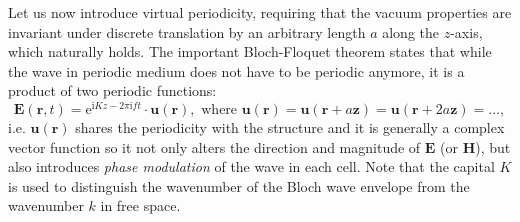 \documentclass[letterpaper,12pt]{report}
\begin{document}
Let us now introduce virtual periodicity, requiring that the vacuum properties are invariant under discrete translation by an arbitrary length $a$ along the $z$-axis, which naturally holds. The important Bloch-Floquet theorem states that while the wave in periodic medium does not have to be periodic anymore, it is a product of two periodic functions:
\begin{equation} \mathbf{E}(\mathbf{r}, t) = \mathrm{e}^{\mathrm{i} Kz - 2\pi \mathrm{i} f t} \cdot \mathbf{u}(\mathbf{r}), \text{ where } \mathbf{u}(\mathbf{r}) = \mathbf{u}(\mathbf{r}+a\mathbf{z}) = \mathbf{u}(\mathbf{r}+2a\mathbf{z}) = \ldots, \label{eq_bloch}\end{equation} 
i.e. $\mathbf{u}(\mathbf{r})$ shares the periodicity with the structure and it is generally a complex vector function so it not only alters the direction and magnitude of $\mathbf E$ (or  $\mathbf H$), but also introduces \textit{phase modulation} of the wave in each cell. Note that the capital $K$ is used to distinguish the wavenumber of the Bloch wave envelope from the wavenumber $k$ in free space.
\end{document}
